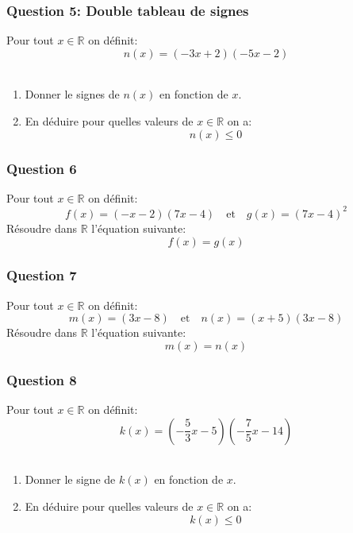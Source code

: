 \documentclass[t,12pt]{beamer}
\newcommand{\R}{\mathbb{R}}
\begin{document}
\begin{frame}
	\frametitle{Question 5: Double tableau de signes}
	Pour tout  $x\in\R$ on définit: $$n(x) = (-3x+2)(-5x-2)$$ \hfill\\[-0.2cm]
	\begin{enumerate}
		\item Donner le signes de $n(x)$ en fonction de $x$.\\ 
		\item En déduire pour quelles valeurs de $x\in\R$ on a:
		$$n(x) \leq 0$$
	\end{enumerate}
	
	
\end{frame}


\begin{frame}
	\frametitle{Question 6}
	Pour tout  $x\in\R$ on définit:$$f(x) = (-x-2)(7x-4) \quad \text{et} \quad g(x) = (7x-4)^2$$
Résoudre dans $\R$ l'équation suivante: 
$$f(x) = g(x) $$
\end{frame}


\begin{frame}
	\frametitle{Question 7}
	Pour tout  $x\in\R$ on définit:$$m(x) = (3x-8) \quad \text{et} \quad n(x) = (x+5)(3x-8)$$
	Résoudre dans $\R$ l'équation suivante: 
	$$m(x) = n(x) $$
\end{frame}
\begin{frame}
	\frametitle{Question 8}
	Pour tout  $x\in\R$ on définit: $$k(x) = (-\dfrac{5}{3}x - 5)(-\dfrac{7}{5}x - 14)$$ \hfill\\[-0.2cm]
	\begin{enumerate}
		\item Donner le signe de $k(x)$ en fonction de $x$.\\ 
		\item En déduire pour quelles valeurs de $x\in\R$ on a:
		$$k(x) \leq 0$$
	\end{enumerate}
	
	
\end{frame}
\end{document}
